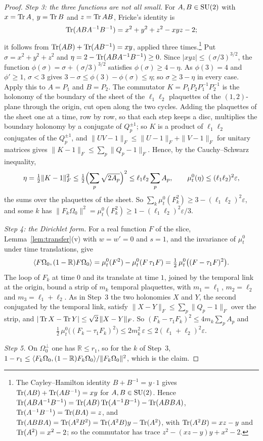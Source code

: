 \begin{proof}
\emph{Step 3: the three functions are not all small.} For $A,B\in\mathrm{SU}(2)$
with $x=\operatorname{Tr} A$, $y=\operatorname{Tr} B$ and $z=\operatorname{Tr} AB$, Fricke's identity is
\[
\operatorname{Tr}(ABA^{-1}B^{-1})=x^2+y^2+z^2-xyz-2 ;
\]
it follows from $\operatorname{Tr}(AB)+\operatorname{Tr}(AB^{-1})=xy$, applied three times.\footnote{The
Cayley--Hamilton identity $B+B^{-1}=y\cdot1$ gives $\operatorname{Tr}(AB)+\operatorname{Tr}(AB^{-1})=xy$
for $A,B\in\mathrm{SU}(2)$. Hence $\operatorname{Tr}(ABA^{-1}B^{-1})=\operatorname{Tr}(AB)\operatorname{Tr}(A^{-1}B^{-1})-
\operatorname{Tr}(ABBA)$, $\operatorname{Tr}(A^{-1}B^{-1})=\operatorname{Tr}(BA)=z$, and $\operatorname{Tr}(ABBA)=\operatorname{Tr}(A^2B^2)=\operatorname{Tr}(A^2B)
y-\operatorname{Tr}(A^2)$, with $\operatorname{Tr}(A^2B)=xz-y$ and $\operatorname{Tr}(A^2)=x^2-2$; so the commutator has
trace $z^2-(xz-y)y+x^2-2$.} Put $\sigma=x^2+y^2+z^2$ and $\eta=2-\operatorname{Tr}(ABA^{-1}
B^{-1})\ge0$. Since $|xyz|\le(\sigma/3)^{3/2}$, the function $\phi(\sigma)=
\sigma+(\sigma/3)^{3/2}$ satisfies $\phi(\sigma)\ge4-\eta$. As $\phi(3)=4$ and
$\phi'\ge1$, $\sigma<3$ gives $3-\sigma\le\phi(3)-\phi(\sigma)\le\eta$; so
$\sigma\ge3-\eta$ in every case. Apply this to $A=P_1$ and $B=P_2$. The
commutator $K=P_1P_2P_1^{-1}P_2^{-1}$ is the holonomy of the boundary of the
sheet of the $\ell_1\ell_2$ plaquettes of the $(1,2)$-plane through the
origin, cut open along the two cycles. Adding the plaquettes of the sheet
one at a time, row by row, so that each step keeps a disc, multiplies the
boundary holonomy by a conjugate of $Q_p^{\pm1}$; so $K$ is a product of
$\ell_1\ell_2$ conjugates of the $Q_p^{\pm1}$, and $\|UV-1\|_F\le\|U-1\|_F+
\|V-1\|_F$ for unitary matrices gives $\|K-1\|_F\le\sum_p\|Q_p-1\|_F$.
Hence, by the Cauchy--Schwarz inequality,
\[
\eta=\tfrac12\|K-1\|_F^2\le\tfrac12\Bigl(\sum_p\sqrt{2A_p}\Bigr)^2\le\ell_1
\ell_2\sum_{p}A_p,\qquad\mu^0_t(\eta)\le(\ell_1\ell_2)^2\varepsilon ,
\]
the sums over the plaquettes of the sheet. So $\sum_k\mu^0_t(F_k^2)\ge3-(\ell_1
\ell_2)^2\varepsilon$, and some $k$ has $\|F_k\Omega_0\|^2=\mu^0_t(F_k^2)\ge1-
(\ell_1\ell_2)^2\varepsilon/3$.

\emph{Step 4: the Dirichlet form.} For a real function $F$ of the slice,
Lemma~\ref{lem:transfer}(v) with $w=w'=0$ and $s=1$, and the invariance of
$\mu^0_t$ under time translations, give
\[
\langle F\Omega_0,(1-\mathbb R)F\Omega_0\rangle=\mu^0_t(F^2)-\mu^0_t(F\,\tau_1F)=\tfrac
12\,\mu^0_t\bigl((F-\tau_1F)^2\bigr).
\]
The loop of $F_k$ at time $0$ and its translate at time $1$, joined by the
temporal link at the origin, bound a strip of $m_k$ temporal plaquettes,
with $m_1=\ell_1$, $m_2=\ell_2$ and $m_3=\ell_1+\ell_2$. As in Step~3 the two
holonomies $X$ and $Y$, the second conjugated by the temporal link, satisfy
$\|X-Y\|_F\le\sum_p\|Q_p-1\|_F$ over the strip, and $|\operatorname{Tr} X-\operatorname{Tr} Y|\le\sqrt2\,
\|X-Y\|_F$. So $(F_k-\tau_1F_k)^2\le4m_k\sum_pA_p$ and
\[
\tfrac12\,\mu^0_t\bigl((F_k-\tau_1F_k)^2\bigr)\le2m_k^2\,\varepsilon\le2(\ell_1+
\ell_2)^2\varepsilon .
\]

\emph{Step 5.} On $\Omega_0^\perp$ one has $\mathbb R\le r_1$, so for the $k$
of Step~3, $1-r_1\le\langle F_k\Omega_0,(1-\mathbb R)F_k\Omega_0\rangle/\|F_k\Omega_0\|^2$,
which is the claim.
\end{proof}

